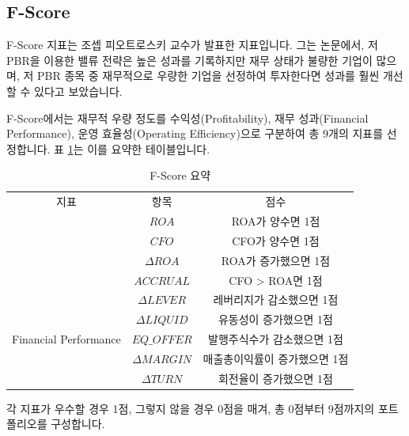 \documentclass[12pt,]{book}
\begin{document}
\hypertarget{f-score}{%
\subsection{F-Score}\label{f-score}}

F-Score 지표는 조셉 피오트로스키 교수가 발표한 지표입니다. 그는 논문에서, 저 PBR을 이용한 밸류 전략은 높은 성과를 기록하지만 재무 상태가 불량한 기업이 많으며, 저 PBR 종목 중 재무적으로 우량한 기업을 선정하여 투자한다면 성과를 훨씬 개선할 수 있다고 보았습니다.

F-Score에서는 재무적 우량 정도를 수익성(Profitability), 재무 성과(Financial Performance), 운영 효율성(Operating Efficiency)으로 구분하여 총 9개의 지표를 선정합니다. 표 \ref{tab:fscore}는 이를 요약한 테이블입니다.

\begin{table}[!h]

\caption{\label{tab:fscore}F-Score 요약}
\centering
\begin{tabular}{ccc}
\toprule
지표 & 항목 & 점수\\
\rowcolor{gray!6}
\midrule
 & $ROA$ & ROA가 양수면 1점\\

\rowcolor{gray!6}
 & $CFO$ & CFO가 양수면 1점\\

\rowcolor{gray!6}
 & $\Delta ROA$ & ROA가 증가했으면 1점\\

\rowcolor{gray!6}
\multirow{-4}{*}{\centering\arraybackslash Profitability} & $ACCRUAL$ & CFO > ROA면 1점\\
\cmidrule{1-3}
 & $\Delta LEVER$ & 레버리지가 감소했으면 1점\\

 & $\Delta LIQUID$ & 유동성이 증가했으면 1점\\

\multirow{-3}{*}{\centering\arraybackslash Financial Performance} & $EQ\_OFFER$ & 발행주식수가 감소했으면 1점\\
\cmidrule{1-3}
\rowcolor{gray!6}
 & $\Delta MARGIN$ & 매출총이익률이 증가했으면 1점\\

\rowcolor{gray!6}
\multirow{-2}{*}{\centering\arraybackslash Operating Efficiency} & $\Delta TURN$ & 회전율이 증가했으면 1점\\
\bottomrule
\end{tabular}
\end{table}

각 지표가 우수할 경우 1점, 그렇지 않을 경우 0점을 매겨, 총 0점부터 9점까지의 포트폴리오를 구성합니다.
\end{document}
